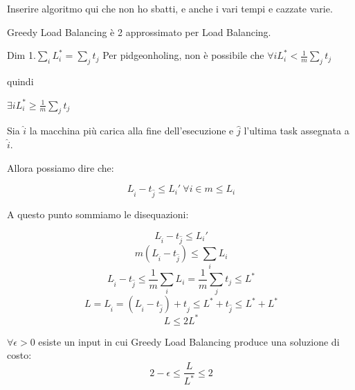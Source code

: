     Inserire algoritmo qui che non ho sbatti, e anche i vari tempi e cazzate varie.

    \begin{teorema}
        Greedy Load Balancing è 2 approssimato per Load Balancing.
    \end{teorema}

    \begin{dimostrazione}

        \begin{giustificazione}{Dim 1.}{$\sum_{i} L_i^* = \sum_{j} t_j$}
            Per pidgeonholing, non è possibile che
            $\forall i L^*_i < \frac 1 m \sum_{j}t_j$

            quindi

            $\exists i L^*_i \ge \frac 1 m \sum_j t_j$
        \end{giustificazione}


        \separapassaggi

        Sia $\hat i$ la macchina più carica alla fine dell'esecuzione e $\hat j$ l'ultima task assegnata a $\hat i$.

        Allora possiamo dire che:

        \[
            L_{\hat i} - t_{\hat j} \le L_i'\ \forall i \in m \le L_{i}
        \]

        A questo punto sommiamo le disequazioni:

        \[
            L_{\hat i} - t_{\hat j} \le L_i'
        \]
        \[
            m(L_{\hat i} - t_{\hat j}) \le \sum_i L_i
        \]
        \[
            L_{\hat i} - t_{\hat j} \le \frac 1 m \sum_i L_i
            = \frac 1 m \sum_j t_j\le L^*
        \]
        \[
            L = L_{\hat i} = (L_{\hat i} - t_{\hat j}) + t_{\hat j}
            \le L^* + t_{\hat j}\le L^*+L^*
        \]
        \[
            L\le2L^*
        \]

    \end{dimostrazione}

    \begin{teorema}
        $\forall \epsilon > 0$ esiste un input in cui Greedy Load Balancing produce una soluzione di costo:
        \[
            2-\epsilon \le \frac{L}{L^*} \le 2
        \]
    \end{teorema}

